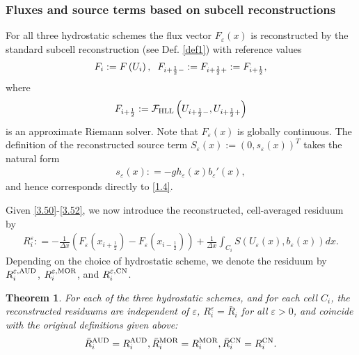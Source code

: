 \documentclass[11pt,a4paper,center,notitlepage]{article}
\numberwithin{equation}{section}
\newtheorem{theorem}{Theorem}
\begin{document}
\subsubsection{Fluxes and source terms based on subcell reconstructions}
For all three hydrostatic schemes the flux vector $F_\varepsilon \left(x\right)$ is reconstructed by the standard subcell reconstruction (see Def. \ref{def1}) with reference values
\begin{align}
\label{3.50}
{F_i}: = F\left( {{U_i}} \right), \hspace{2mm} {F_{i + \frac{1}{2} - }}: = {F_{i + \frac{1}{2} + }}: = {F_{i + \frac{1}{2}}},
\end{align}
where
\begin{align}
{F_{i + \frac{1}{2}}}: = \mathcal{F}_{\rm HLL} \left( {{U_{i + \frac{1}{2} - }},{U_{i + \frac{1}{2} + }}} \right)
\end{align}
is an approximate Riemann solver. Note that $F_\varepsilon \left(x\right)$ is globally continuous. The definition of the reconstructed source term $S_\varepsilon \left(x\right) := \left(0,s_\varepsilon \left(x\right)\right)^T$ takes the natural form
\begin{align}
\label{3.52}
{s_\varepsilon }\left( x \right): =  - g{h_\varepsilon }\left( x \right){b_\varepsilon }'\left( x \right),
\end{align}
and hence corresponds directly to \eqref{1.4}.

Given \eqref{3.50}-\eqref{3.52}, we now introduce the reconstructed, cell-averaged residuum by
\begin{align}
R_i^\varepsilon : =  - \frac{1}{{\Delta x}}\left( {{F_\varepsilon }\left( {{x_{i + \frac{1}{2}}}} \right) - {F_\varepsilon }\left( {{x_{i - \frac{1}{2}}}} \right)} \right) + \frac{1}{{\Delta x}}\int_{{C_i}} {S\left( {{U_\varepsilon }\left( x \right),{b_\varepsilon }\left( x \right)} \right)dx} .
\end{align}
Depending on the choice of hydrostatic scheme, we denote the residuum by $R_i^{\varepsilon ,\rm AUD}$, $R_i^{\varepsilon ,\rm MOR}$, and $R_i^{\varepsilon ,\rm CN}$.

\begin{theorem}
For each of the three hydrostatic schemes, and for each cell $C_i$, the reconstructed residuums are independent of $\varepsilon$, $R_i^\varepsilon  = {{\bar R}_i}$ for all $\varepsilon >0$, and coincide with the original definitions given above:
\begin{align}
\bar R_i^{\rm AUD} = R_i^{\rm AUD},\bar R_i^{\rm MOR} = R_i^{\rm MOR},\bar R_i^{\rm CN} = R_i^{\rm CN}.
\end{align}
\end{theorem}
\end{document}
